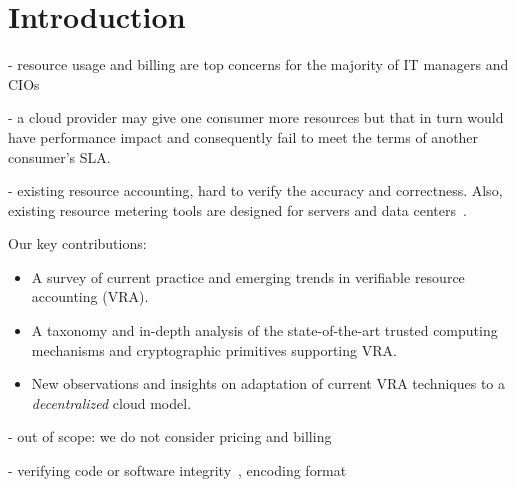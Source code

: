 \section{Introduction} \label{sect:intro}

- resource usage and billing are top concerns for the majority of IT managers and CIOs 

- a cloud provider may give one consumer more resources but that in turn would have performance impact and consequently fail to meet the terms of another consumer's SLA.

- existing resource accounting, hard to verify the accuracy and correctness. Also, existing resource metering tools are designed for servers and data centers~\cite{?}.



Our key contributions:
\begin{itemize}
 \item A survey of current practice and emerging trends in verifiable resource accounting (VRA).
 \item A taxonomy and in-depth analysis of the state-of-the-art trusted computing mechanisms and cryptographic primitives supporting VRA.
 \item New observations and insights on adaptation of current VRA techniques to a {\em decentralized} cloud model.
\end{itemize} 



- out of scope: we do not consider pricing and billing

- verifying code or software integrity~\cite{SLS05,SMV+10}, encoding format~\cite{DJO+12}